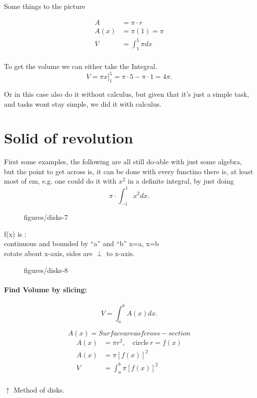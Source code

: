 Some things to the picture

\begin{align*}
    A &= \pi\cdot r \\
    A(x) &= \pi(1)=\pi \\
    V&= \int_{1}^{5} \pi dx  \\
\end{align*}

To get the volume we can either take the Integral.
\[ V=\pi x ]^5_1=\pi\cdot 5-\pi\cdot 1=4\pi .\] 

Or in this case also do it without calculus, but given that it's just a simple
task, and tasks wont stay simple, we did it with calculus.

\clearpage
\section{Solid of revolution}

First some examples, the following are all still do-able with just some
algebra, but the point to get across is, it can be done with every functino
there is, at least most of em, e.g. one could do it with $x^2$ in a definite
integral, by just doing 
\[ \pi\cdot \int_{-1}^{1} x^2 dx .\] 

\begin{figure}[ht]
    \centering
    \caption{figures/disks-7}
    \label{fig:disks-7}
\end{figure}

f(x) is :\\
continuous and bounded by ``a'' and ``b'' x=a, x=b\\
rotate about x-axis, sides are $\perp$ to x-axis.


\begin{figure}[ht]
    \centering
    \caption{figures/disks-8}
    \label{fig:disks-8}
\end{figure}

\paragraph{Find Volume by slicing:}
\[ V= \int_{a}^{b} A(x) dx .\] 

\[ A(x)=Surface area of cross-section \] 
\begin{align*}
    A(x)&=\pi r^2, \quad \text{circle}\ r=f(x)\\
    A(x)&= \pi \left[ f(x) \right]^2 \\
    V&= \int_{a}^{b} \pi \left[ f(x) \right]^2  \\
\end{align*}
\begin{center}
$\uparrow$ Method of disks.
\end{center}

